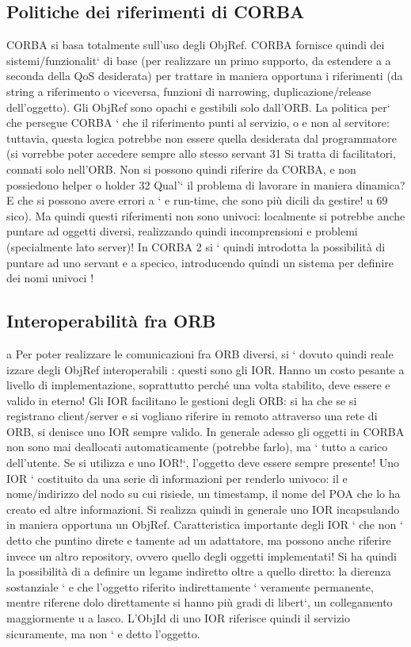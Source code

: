 \documentclass[a4paper,12pt]{article}
\begin{document}
\subsection{Politiche dei riferimenti di CORBA}
CORBA si basa totalmente sull'uso degli ObjRef. CORBA fornisce quindi dei
sistemi/funzionalit` di base (per realizzare un primo supporto, da estendere a
a
seconda della QoS desiderata) per trattare in maniera opportuna i riferimenti
(da string a riferimento o viceversa, funzioni di narrowing, duplicazione/release
dell'oggetto). Gli ObjRef sono opachi e gestibili solo dall'ORB.
La politica per` che persegue CORBA ` che il riferimento punti al servizio,
o
e
non al servitore: tuttavia, questa logica potrebbe non essere quella desiderata dal programmatore (si vorrebbe poter
accedere sempre allo stesso servant
31 Si tratta di facilitatori, connati solo nell'ORB. Non si possono quindi riferire da CORBA,
e non possiedono helper o holder
32 Qual'` il problema di lavorare in maniera dinamica? E che si possono avere errori a
`
e
run-time, che sono più dicili da gestire!
u
69
sico). Ma quindi questi riferimenti non sono univoci: localmente si potrebbe
anche puntare ad oggetti diversi, realizzando quindi incomprensioni e problemi
(specialmente lato server)!
In CORBA 2 si ` quindi introdotta la possibilità di puntare ad uno servant
e
a
specico, introducendo quindi un sistema per definire dei nomi univoci !
\subsection{Interoperabilità fra ORB}
a
Per poter realizzare le comunicazioni fra ORB diversi, si ` dovuto quindi reale
izzare degli ObjRef interoperabili : questi sono gli IOR. Hanno un costo pesante
a livello di implementazione, soprattutto perché una volta stabilito, deve essere
e
valido in eterno!
Gli IOR facilitano le gestioni degli ORB: si ha che se si registrano client/server
e si vogliano riferire in remoto attraverso una rete di ORB, si denisce uno IOR
sempre valido. In generale adesso gli oggetti in CORBA non sono mai deallocati
automaticamente (potrebbe farlo), ma ` tutto a carico dell'utente. Se si utilizza
e
uno IOR!`, l'oggetto deve essere sempre presente!
Uno IOR ` costituito da una serie di informazioni per renderlo univoco: il
e
nome/indirizzo del nodo su cui risiede, un timestamp, il nome del POA che lo ha
creato ed altre informazioni. Si realizza quindi in generale uno IOR incapsulando
in maniera opportuna un ObjRef.
Caratteristica importante degli IOR ` che non ` detto che puntino direte
e
tamente ad un adattatore, ma possono anche riferire invece un altro repository, ovvero quello degli oggetti
implementati! Si ha quindi la possibilità di
a
definire un legame indiretto oltre a quello diretto: la dierenza sostanziale `
e
che l'oggetto riferito indirettamente ` veramente permanente, mentre riferene
dolo direttamente si hanno più gradi di libert`, un collegamento maggiormente
u
a
lasco. L'ObjId di uno IOR riferisce quindi il servizio sicuramente, ma non `
e
detto l'oggetto.
\end{document}
